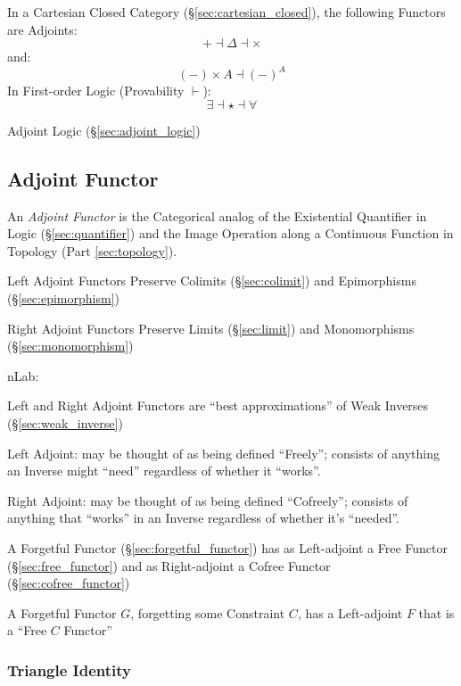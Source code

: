 In a Cartesian Closed Category (\S\ref{sec:cartesian_closed}), the
following Functors are Adjoints:
\[
  + \dashv \Delta \dashv \times
\]
and:
\[
  (-) \times A \dashv (-)^A
\]
In First-order Logic (Provability $\vdash$):
\[
  \exists \dashv \star \dashv \forall
\]

Adjoint Logic (\S\ref{sec:adjoint_logic})



\subsection{Adjoint Functor}\label{sec:adjoint_functor}

An \emph{Adjoint Functor} is the Categorical analog of the Existential
Quantifier in Logic (\S\ref{sec:quantifier}) and the Image Operation
along a Continuous Function in Topology (Part \ref{sec:topology}).

Left Adjoint Functors Preserve Colimits (\S\ref{sec:colimit}) and
Epimorphisms (\S\ref{sec:epimorphism})

Right Adjoint Functors Preserve Limits (\S\ref{sec:limit}) and
Monomorphisms (\S\ref{sec:monomorphism})

nLab:

Left and Right Adjoint Functors are ``best approximations'' of Weak
Inverses (\S\ref{sec:weak_inverse})

Left Adjoint: may be thought of as being defined ``Freely''; consists
of anything an Inverse might ``need'' regardless of whether it
``works''.

Right Adjoint: may be thought of as being defined ``Cofreely'';
consists of anything that ``works'' in an Inverse regardless of
whether it's ``needed''.

A Forgetful Functor (\S\ref{sec:forgetful_functor}) has as
Left-adjoint a Free Functor (\S\ref{sec:free_functor}) and as
Right-adjoint a Cofree Functor (\S\ref{sec:cofree_functor})

A Forgetful Functor $G$, forgetting some Constraint $C$, has a
Left-adjoint $F$ that is a ``Free $C$ Functor'' %



\subsubsection{Triangle Identity}\label{sec:triangle_identity}

